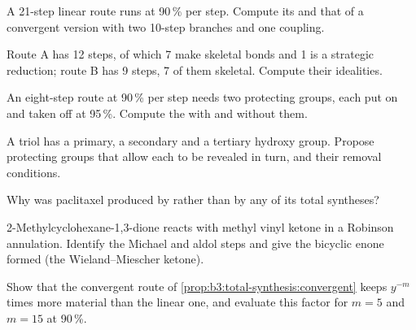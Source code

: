 \begin{exercise}[$\star\star$]\label{exo:b3:total-synthesis:5}
A 21-step linear route runs at 90\,\% per step. Compute its  and that
of a convergent version with two 10-step branches and one coupling.
\end{exercise}

\begin{exercise}[$\star\star$]\label{exo:b3:total-synthesis:6}
Route A has 12 steps, of which 7 make skeletal bonds and 1 is a strategic
reduction; route B has 9 steps, 7 of them skeletal. Compute their idealities.
\end{exercise}

\begin{exercise}[$\star\star$]\label{exo:b3:total-synthesis:7}
An eight-step route at 90\,\% per step needs two protecting groups, each put on and
taken off at 95\,\%. Compute the  with and without them.
\end{exercise}

\begin{exercise}[$\star\star$]\label{exo:b3:total-synthesis:8}
A triol has a primary, a secondary and a tertiary hydroxy group. Propose
protecting groups that allow each to be revealed in turn, and their removal
conditions.
\end{exercise}

\begin{exercise}[$\star\star$]\label{exo:b3:total-synthesis:9}
Why was paclitaxel produced by  rather than by any of its total
syntheses?
\end{exercise}

\begin{exercise}[$\star\star\star$]\label{exo:b3:total-synthesis:10}
2-Methylcyclohexane-1,3-dione reacts with methyl vinyl ketone in a Robinson
annulation. Identify the Michael and aldol steps and give the bicyclic enone
formed (the Wieland--Miescher ketone).
\end{exercise}

\begin{exercise}[$\star\star\star$]\label{exo:b3:total-synthesis:11}
Show that the convergent route of \cref{prop:b3:total-synthesis:convergent} keeps
$y^{-m}$ times more material than the linear one, and evaluate this factor for $m = 5$ and
$m = 15$ at 90\,\%.
\end{exercise}

